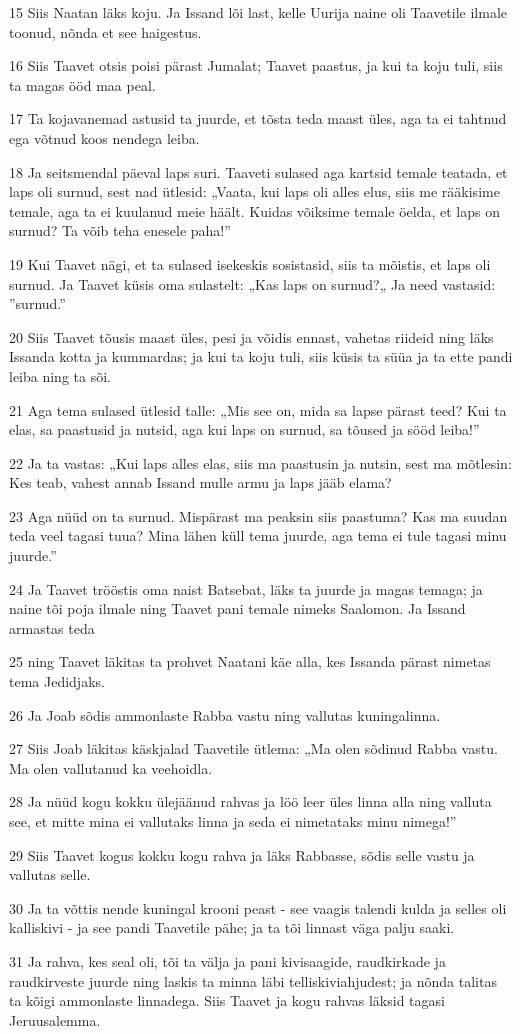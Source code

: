 \par 15 Siis Naatan läks koju. Ja Issand lõi last, kelle Uurija naine oli Taavetile ilmale toonud, nõnda et see haigestus.
\par 16 Siis Taavet otsis poisi pärast Jumalat; Taavet paastus, ja kui ta koju tuli, siis ta magas ööd maa peal.
\par 17 Ta kojavanemad astusid ta juurde, et tõsta teda maast üles, aga ta ei tahtnud ega võtnud koos nendega leiba.
\par 18 Ja seitsmendal päeval laps suri. Taaveti sulased aga kartsid temale teatada, et laps oli surnud, sest nad ütlesid: „Vaata, kui laps oli alles elus, siis me rääkisime temale, aga ta ei kuulanud meie häält. Kuidas võiksime temale öelda, et laps on surnud? Ta võib teha enesele paha!”
\par 19 Kui Taavet nägi, et ta sulased isekeskis sosistasid, siis ta mõistis, et laps oli surnud. Ja Taavet küsis oma sulastelt: „Kas laps on surnud?„ Ja need vastasid: ”surnud.”
\par 20 Siis Taavet tõusis maast üles, pesi ja võidis ennast, vahetas riideid ning läks Issanda kotta ja kummardas; ja kui ta koju tuli, siis küsis ta süüa ja ta ette pandi leiba ning ta sõi.
\par 21 Aga tema sulased ütlesid talle: „Mis see on, mida sa lapse pärast teed? Kui ta elas, sa paastusid ja nutsid, aga kui laps on surnud, sa tõused ja sööd leiba!”
\par 22 Ja ta vastas: „Kui laps alles elas, siis ma paastusin ja nutsin, sest ma mõtlesin: Kes teab, vahest annab Issand mulle armu ja laps jääb elama?
\par 23 Aga nüüd on ta surnud. Mispärast ma peaksin siis paastuma? Kas ma suudan teda veel tagasi tuua? Mina lähen küll tema juurde, aga tema ei tule tagasi minu juurde.”
\par 24 Ja Taavet trööstis oma naist Batsebat, läks ta juurde ja magas temaga; ja naine tõi poja ilmale ning Taavet pani temale nimeks Saalomon. Ja Issand armastas teda
\par 25 ning Taavet läkitas ta prohvet Naatani käe alla, kes Issanda pärast nimetas tema Jedidjaks.
\par 26 Ja Joab sõdis ammonlaste Rabba vastu ning vallutas kuningalinna.
\par 27 Siis Joab läkitas käskjalad Taavetile ütlema: „Ma olen sõdinud Rabba vastu. Ma olen vallutanud ka veehoidla.
\par 28 Ja nüüd kogu kokku ülejäänud rahvas ja löö leer üles linna alla ning valluta see, et mitte mina ei vallutaks linna ja seda ei nimetataks minu nimega!”
\par 29 Siis Taavet kogus kokku kogu rahva ja läks Rabbasse, sõdis selle vastu ja vallutas selle.
\par 30 Ja ta võttis nende kuningal krooni peast - see vaagis talendi kulda ja selles oli kalliskivi - ja see pandi Taavetile pähe; ja ta tõi linnast väga palju saaki.
\par 31 Ja rahva, kes seal oli, tõi ta välja ja pani kivisaagide, raudkirkade ja raudkirveste juurde ning laskis ta minna läbi telliskiviahjudest; ja nõnda talitas ta kõigi ammonlaste linnadega. Siis Taavet ja kogu rahvas läksid tagasi Jeruusalemma.

